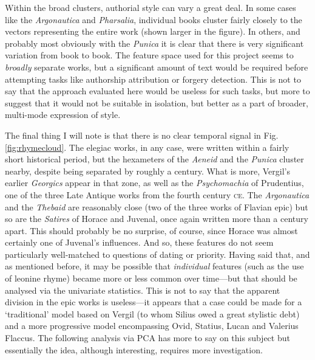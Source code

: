 \documentclass[twocolumn, switch]{article} %
\begin{document}
Within the broad clusters, authorial style can vary a great deal. In some
cases like the \emph{Argonautica} and \emph{Pharsalia}, individual books
cluster fairly closely to the vectors representing the entire work (shown
larger in the figure). In others, and probably most obviously with the
\emph{Punica} it is clear that there is very significant variation from book
to book. The feature space used for this project seems to \emph{broadly}
separate works, but a significant amount of text would be required before
attempting tasks like authorship attribution or forgery detection. This is not
to say that the approach evaluated here would be useless for such tasks, but
more to suggest that it would not be suitable in isolation, but better as a
part of broader, multi-mode expression of style.

The final thing I will note is that there is no clear temporal signal in Fig.
\ref{fig:rhymecloud}. The elegiac works, in any case, were written within a
fairly short historical period, but the hexameters of the \emph{Aeneid} and
the \emph{Punica} cluster nearby, despite being separated by roughly a
century. What is more, Vergil's earlier \emph{Georgics} appear in that zone,
as well as the \emph{Psychomachia} of Prudentius, one of the three Late
Antique works from the fourth century \textsc{ce}. The \emph{Argonautica} and the
\emph{Thebaid} are reasonably close (two of the three works of Flavian epic)
but so are the \emph{Satires} of Horace and Juvenal, once again written more
than a century apart. This should probably be no surprise, of course, since
Horace was almost certainly one of Juvenal's influences. And so, these
features do not seem particularly well-matched to questions of dating or
priority. Having said that, and as mentioned before, it may be possible that
\emph{individual} features (such as the use of leonine rhyme) became more or
less common over time---but that should be analysed via the univariate
statistics. This is not to say that the apparent division in the epic works is
useless---it appears that a case could be made for a `traditional' model based
on Vergil (to whom Silius owed a great stylistic debt) and a more progressive
model encompassing Ovid, Statius, Lucan and Valerius Flaccus. The following
analysis via PCA has more to say on this subject but essentially the idea,
although interesting, requires more investigation.
\end{document}
